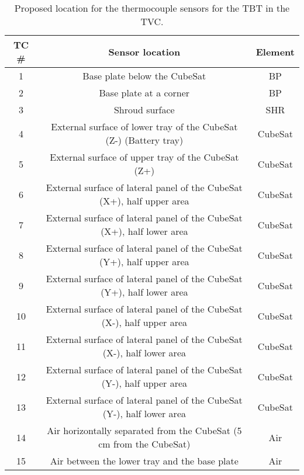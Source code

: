 \begin{table}[H]
\centering
\caption{Proposed location for the thermocouple sensors for the TBT in the TVC.}
\label{tab:TSU-Placement-of-the-temp-sensors}
\begin{tabular}{ccc} \hline
TC \# & Sensor location                                                          & Element \\ \hline \hline
1     & Base plate below the CubeSat                                             & BP      \\
2     & Base plate at a corner                                                   & BP      \\
3     & Shroud surface                                                           & SHR     \\
4     & External surface of lower tray of the   CubeSat (Z-) (Battery tray)      & CubeSat \\
5     & External surface of upper tray of the   CubeSat (Z+)                     & CubeSat \\
6     & External surface of lateral panel of the   CubeSat (X+), half upper area & CubeSat \\
7     & External surface of lateral panel of the   CubeSat (X+), half lower area & CubeSat \\
8     & External surface of lateral panel of the   CubeSat (Y+), half upper area & CubeSat \\
9     & External surface of lateral panel of the   CubeSat (Y+), half lower area & CubeSat \\
10    & External surface of lateral panel of the   CubeSat (X-), half upper area & CubeSat \\
11    & External surface of lateral panel of the   CubeSat (X-), half lower area & CubeSat \\
12    & External surface of lateral panel of the   CubeSat (Y-), half upper area & CubeSat \\
13    & External surface of lateral panel of the   CubeSat (Y-), half lower area & CubeSat \\
14    & Air   horizontally separated from the CubeSat (5 cm from the CubeSat)    & Air     \\
15    & Air between the   lower tray and the base plate                          & Air    \\ \hline
\end{tabular}
\end{table}




